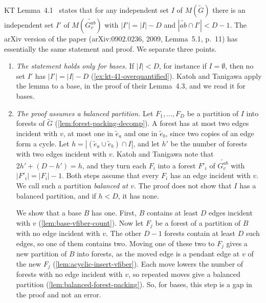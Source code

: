 \begin{remark}[On KT Lemma~4.1]
  \label{rem:kt-lemma-41}
  KT Lemma~4.1~\cite[p.~660]{katohTanigawa2011} states that for any
  independent set $I$ of $M(\tilde G)$ there is an independent set $I'$
  of $M(\widetilde{G_v^{ab}})$ with $|I'| = |I| - D$ and
  $|\widetilde{ab} \cap I'| < D - 1$. The arXiv version of the paper
  (arXiv:0902.0236, 2009, Lemma~5.1, p.~11) has essentially the same
  statement and proof. We separate three points.
  \begin{enumerate}
    \item \emph{The statement holds only for bases.} If $|I| < D$, for
      instance if $I = \emptyset$, then no set $I'$ has
      $|I'| = |I| - D$ (\cref{ex:kt-41-overquantified}). Katoh and
      Tanigawa apply the lemma to a base, in the proof of their
      Lemma~4.3, and we read it for bases.
    \item \emph{The proof assumes a balanced partition.} Let
      $F_1, \dots, F_D$ be a partition of $I$ into forests of $\tilde G$
      (\cref{lem:forest-packing-decomp}). A forest has at most two edges
      incident with $v$, at most one in $\tilde e_a$ and one in
      $\tilde e_b$, since two copies of an edge form a cycle. Let
      $h = |(\tilde e_a \cup \tilde e_b) \cap I|$, and let $h'$ be the
      number of forests with two edges incident with $v$. Katoh and
      Tanigawa note that $2h' + (D - h') = h$, and they turn each $F_i$
      into a forest $F'_i$ of $\widetilde{G_v^{ab}}$ with
      $|F'_i| = |F_i| - 1$. Both steps assume that every $F_i$ has an
      edge incident with $v$. We call such a partition \emph{balanced at
      $v$}. The proof does not show that $I$ has a balanced partition,
      and if $h < D$, it has none.

      We show that a base $B$ has one. First, $B$ contains at least $D$
      edges incident with $v$ (\cref{lem:base-vfiber-count}). Now let
      $F_j$ be a forest of a partition of $B$ with no edge incident with
      $v$. The other $D - 1$ forests contain at least $D$ such edges, so
      one of them contains two. Moving one of these two to $F_j$ gives a
      new partition of $B$ into forests, as the moved edge is a
      pendant edge at $v$ of the new $F_j$
      (\cref{lem:acyclic-insert-vfiber}).
      Each move lowers the number of forests with no edge incident with
      $v$, so repeated moves give a balanced partition
      (\cref{lem:balanced-forest-packing}). So, for bases, this step is a
      gap in the proof and not an error.


\end{enumerate}
\end{remark}
